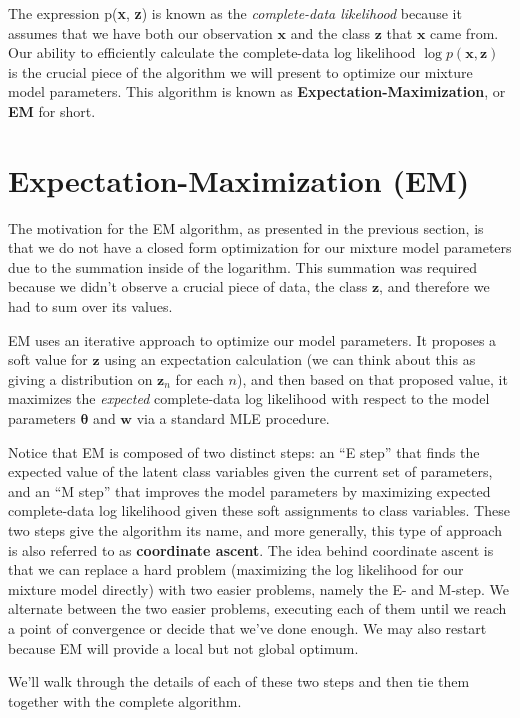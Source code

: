 The expression p(\textbf{x}, \textbf{z}) is known as the \textit{complete-data likelihood} because it assumes that we have both our observation $\textbf{x}$ and the class $\textbf{z}$ that $\textbf{x}$ came from. Our ability to efficiently calculate the complete-data log likelihood $\log p(\textbf{x}, \textbf{z})$ is the crucial piece of the algorithm we will present to optimize our mixture model parameters. This algorithm is known as \textbf{Expectation-Maximization}, or \textbf{EM} for short.

\section{Expectation-Maximization (EM)}
The motivation for the EM algorithm, as presented in the previous section, is that we do not have a closed form optimization for our mixture model parameters due to the summation inside of the logarithm. This summation was required because we didn't observe a crucial piece of data, the class $\textbf{z}$, and therefore we had to sum over its values.

EM uses an iterative approach to optimize our model parameters. It proposes a soft value for $\textbf{z}$ using an expectation calculation (we can think about this as giving a distribution on $\textbf{z}_n$ for each $n$), and then based on that proposed value, it maximizes the {\em expected} complete-data log likelihood with respect to the model parameters $\boldsymbol{\theta}$ and $\textbf{w}$ via a standard MLE procedure.

Notice that EM is composed of two distinct steps: an ``E step'' that finds the expected value of the latent class variables given the current set of parameters, and an ``M step'' that improves the model parameters by maximizing expected complete-data log likelihood given these soft assignments to class variables. These two steps give the algorithm its name, and more generally, this type of approach is also referred to as \textbf{coordinate ascent}. The idea behind coordinate ascent is that we can replace a hard problem (maximizing the log likelihood for our mixture model directly) with two easier problems, namely the E- and M-step. We alternate between the two easier problems, executing each of them until we reach a point of convergence or decide that we've done enough. We may also restart because EM will provide a local but not global optimum.

We'll walk through the details of each of these two steps and then tie them together with the complete algorithm.

